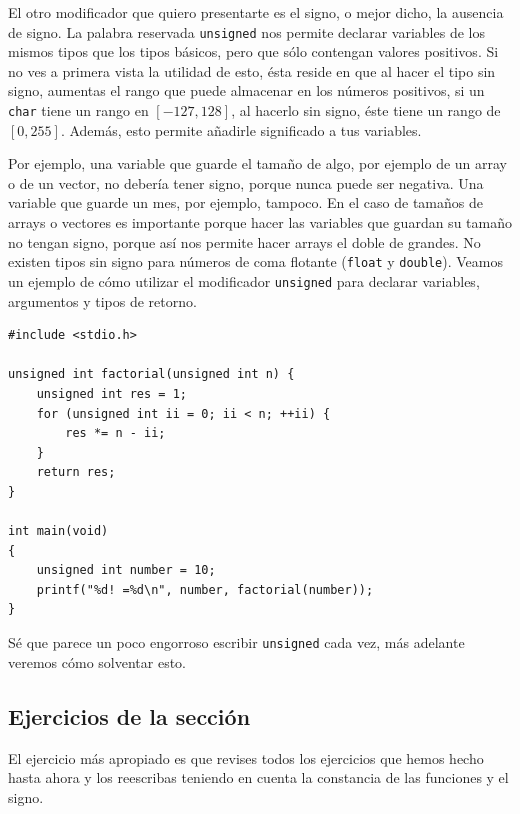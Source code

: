 \documentclass[a4paper]{article}
\begin{document}
El otro modificador que quiero presentarte es el signo, o mejor dicho, la
ausencia de signo. La palabra reservada \lstinline[style=C]!unsigned! nos
permite declarar variables de los mismos tipos que los tipos básicos, pero
que sólo contengan valores positivos. Si no ves a primera vista la utilidad de
esto, ésta reside en que al hacer el tipo sin signo, aumentas el rango que puede
almacenar en los números positivos, si un \verb!char! tiene un rango en
$[-127, 128]$, al hacerlo sin signo, éste tiene un rango de $[0, 255]$. Además,
esto permite añadirle significado a tus variables.

Por ejemplo, una variable que guarde el tamaño de algo, por ejemplo de un array
o de un vector, no debería tener signo, porque nunca puede ser negativa. Una
variable que guarde un mes, por ejemplo, tampoco. En el caso de tamaños de
arrays o vectores es importante porque hacer las variables que guardan su
tamaño no tengan signo, porque así nos permite hacer arrays el doble de grandes.
No existen tipos sin signo para números de coma flotante (\verb!float!
y \verb!double!).
Veamos un ejemplo de cómo utilizar el modificador \verb!unsigned! para declarar
variables, argumentos y tipos de retorno.

\noindent
\begin{minipage}[H]{\linewidth}
\mbox{}
\begin{lstlisting}[style=C,
caption={Uso de tipos sin signo},
label={lst:unsignedTypes}]
#include <stdio.h>

unsigned int factorial(unsigned int n) {
    unsigned int res = 1;
    for (unsigned int ii = 0; ii < n; ++ii) {
        res *= n - ii;
    }
    return res;
}

int main(void)
{
    unsigned int number = 10;
    printf("%d! =%d\n", number, factorial(number));
}
\end{lstlisting}
\end{minipage}

Sé que parece un poco engorroso escribir \verb!unsigned! cada vez, más adelante
veremos cómo solventar esto.
\subsection{Ejercicios de la sección}
El ejercicio más apropiado es que revises todos los ejercicios que
hemos hecho hasta ahora y los reescribas teniendo en cuenta la constancia de las
funciones y el signo.
\end{document}
